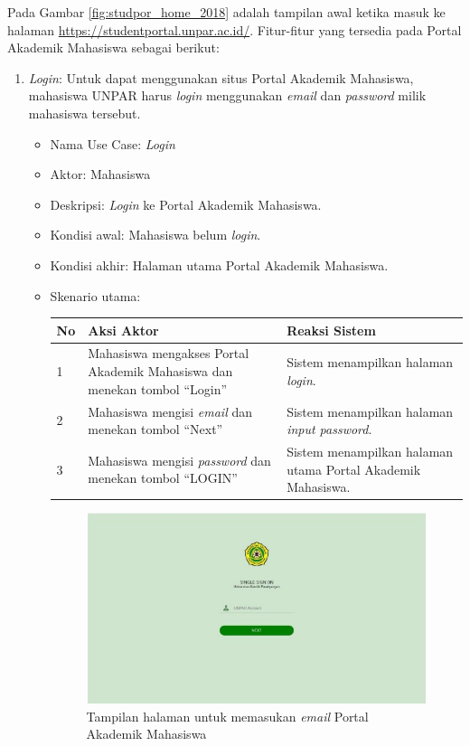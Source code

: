 Pada Gambar \ref{fig:studpor_home_2018} adalah tampilan awal ketika masuk ke halaman \url{https://studentportal.unpar.ac.id/}. Fitur-fitur yang tersedia pada Portal Akademik Mahasiswa sebagai berikut:
\begin{enumerate}
	\item \textit{Login}: Untuk dapat menggunakan situs Portal Akademik Mahasiswa, mahasiswa UNPAR harus \textit{login} menggunakan \textit{email} dan \textit{password} milik mahasiswa tersebut.
	\begin{itemize}
		\item Nama Use Case: \textit{Login}
		\item Aktor: Mahasiswa
		\item Deskripsi: \textit{Login} ke Portal Akademik Mahasiswa.
		\item Kondisi awal: Mahasiswa belum \textit{login}.
		\item Kondisi akhir: Halaman utama Portal Akademik Mahasiswa.
		\item Skenario utama:
		\begin{table}[h!]
			\centering
			\label{}
			\begin{tabular}{ | m{0.5cm} | m{7cm}| m{6cm} | } 
				\hline
				No & Aksi Aktor & Reaksi Sistem \\ 
				\hline
				1 & Mahasiswa mengakses Portal Akademik Mahasiswa dan menekan tombol ``Login'' & Sistem menampilkan halaman \textit{login}.
				\\ 
				\hline
				2 & Mahasiswa mengisi \textit{email} dan menekan tombol ``Next'' & Sistem menampilkan halaman \textit{input password}.
				\\ 
				\hline
				3 & Mahasiswa mengisi \textit{password} dan menekan tombol ``LOGIN'' & Sistem menampilkan halaman utama Portal Akademik Mahasiswa.
				\\ 
				\hline
			\end{tabular}
		\end{table}
	
		\begin{figure}[H]
			\centering
			\includegraphics[scale=0.7]{Gambar/sso2018.jpg}
			\caption{Tampilan halaman untuk memasukan \textit{email} Portal Akademik Mahasiswa} 
			\label{fig:sso_2018}
		\end{figure}
		

\end{itemize}
\end{enumerate}
